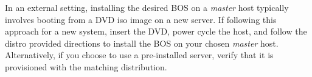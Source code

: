 In an external setting, installing the desired BOS on a {\em master} host 
typically involves booting from a DVD iso image on a new server. If following
this approach for a new system, insert the \baseOS{} DVD, power cycle the host,
and follow the distro provided directions to install the BOS on your chosen
{\em master} host.  Alternatively, if you choose to use a pre-installed server,
verify that it is provisioned with the matching \baseOS{} distribution.

